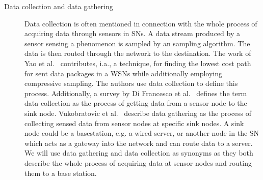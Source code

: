 \begin{description}
    \item[Data collection and data gathering] 
        Data collection is often mentioned in connection with the whole process
        of acquiring data through sensors in \acp{SN}. A data stream produced
        by a sensor sensing a phenomenon is sampled by an sampling algorithm.
        The data is then routed through the network to the destination. The
        work of Yao et al.~\cite{yao2015edal} contributes, i.a., a technique,
        for finding the lowest cost path for sent data packages in a \acp{WSN}
        while additionally employing compressive sampling. The authors use data
        collection to define this process. Additionally, a survey by Di
        Francesco et al.~\cite{di2011data} defines the term data collection as
        the process of getting data from a sensor node to the sink node.
        Vukobratovic et al.~\cite{vukobratovic2010rateless} describe data
        gathering as the process of collecting sensed data from sensor nodes at
        specific sink nodes. A sink node could be a basestation, e.g. a wired
        server, or another node in the \ac{SN} which acts as a gateway into the
        network and can route data to a server. We will use data gathering and
        data collection as synonyms as they both describe the whole process of
        acquiring data at sensor nodes and routing them to a base station.


\end{description}
